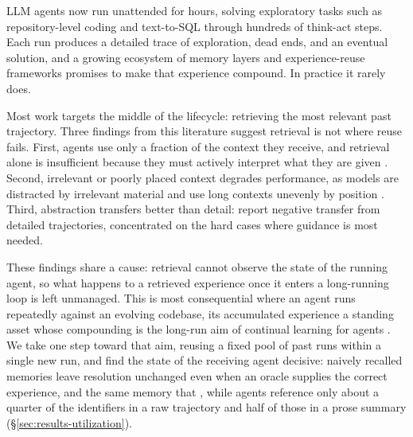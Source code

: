 \documentclass{article}
\begin{document}
LLM agents now run unattended for hours, solving exploratory tasks such as repository-level coding \citep{jimenez2024swebench} and text-to-SQL \citep{spider2018} through hundreds of think-act steps. Each run produces a detailed trace of exploration, dead ends, and an eventual solution, and a growing ecosystem of memory layers \citep{chhikara2025mem0, zhang2026swecontextbench} and experience-reuse frameworks \citep{shinn2023reflexion, zhao2024expel, wang2024awm, wang2023voyager} promises to make that experience compound. In practice it rarely does.

Most work targets the middle of the lifecycle: retrieving the most relevant past trajectory. Three findings from this literature suggest retrieval is not where reuse fails. First, agents use only a fraction of the context they receive, and retrieval alone is insufficient because they must actively interpret what they are given \citep{zhang2026swecontextbench}. Second, irrelevant or poorly placed context degrades performance, as models are distracted by irrelevant material and use long contexts unevenly by position \citep{shi2023distracted, liu2023lost}. Third, abstraction transfers better than detail: \citet{hu2026continual} report negative transfer from detailed trajectories, concentrated on the hard cases where guidance is most needed.

These findings share a cause: retrieval cannot observe the state of the running agent, so what happens to a retrieved experience once it enters a long-running loop is left unmanaged. This is most consequential where an agent runs repeatedly against an evolving codebase, its accumulated experience a standing asset whose compounding is the long-run aim of continual learning for agents \citep{hu2026continual}. We take one step toward that aim, reusing a fixed pool of past runs within a single new run, and find the state of the receiving agent decisive: naively recalled memories leave resolution unchanged even when an oracle supplies the correct experience, and the same memory that , while agents reference only about a quarter of the identifiers in a raw trajectory and half of those in a prose summary (\S\ref{sec:results-utilization}).
\end{document}

